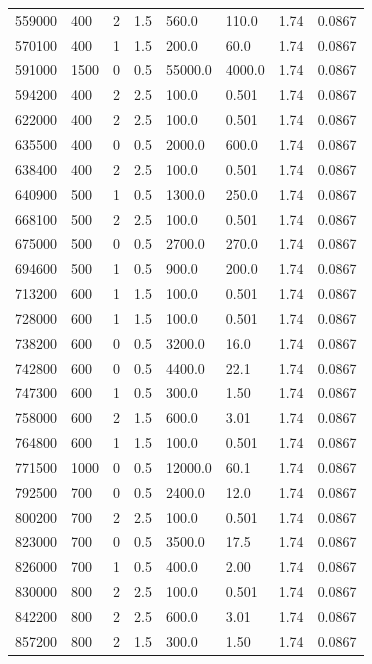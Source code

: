 \documentclass[preview]{standalone}
\begin{document}
{{{\begin{tabular}{L{1.2cm}C{1.2cm} C{0.3cm}C{0.5cm} C{1.4cm}C{1.4cm} C{1.4cm}C{1.4cm}}
  559000  &   400  & 2     & 1.5 &  560.0  & 110.0  & 1.74 &  0.0867   \\ 
  570100  &   400  & 1     & 1.5 &  200.0  & 60.0  & 1.74 &  0.0867   \\ 
  591000  &  1500  & 0     & 0.5 &  55000.0  & 4000.0  & 1.74 &  0.0867   \\ 
  594200  &   400  & 2     & 2.5 &  100.0  & 0.501  & 1.74 &  0.0867   \\ 
  622000  &   400  & 2     & 2.5 &  100.0  & 0.501  & 1.74 &  0.0867   \\ 
  635500  &   400  & 0     & 0.5 &  2000.0  & 600.0  & 1.74 &  0.0867   \\ 
  638400  &   400  & 2     & 2.5 &  100.0  & 0.501  & 1.74 &  0.0867   \\ 
  640900  &   500  & 1     & 0.5 &  1300.0  & 250.0  & 1.74 &  0.0867   \\ 
  668100  &   500  & 2     & 2.5 &  100.0  & 0.501  & 1.74 &  0.0867   \\ 
  675000  &   500  & 0     & 0.5 &  2700.0  & 270.0  & 1.74 &  0.0867   \\ 
  694600  &   500  & 1     & 0.5 &  900.0  & 200.0  & 1.74 &  0.0867   \\ 
  713200  &   600  & 1     & 1.5 &  100.0  & 0.501  & 1.74 &  0.0867   \\ 
  728000  &   600  & 1     & 1.5 &  100.0  & 0.501  & 1.74 &  0.0867   \\ 
  738200  &   600  & 0     & 0.5 &  3200.0  & 16.0  & 1.74 &  0.0867   \\ 
  742800  &   600  & 0     & 0.5 &  4400.0  & 22.1  & 1.74 &  0.0867   \\ 
  747300  &   600  & 1     & 0.5 &  300.0  & 1.50  & 1.74 &  0.0867   \\ 
  758000  &   600  & 2     & 1.5 &  600.0  & 3.01  & 1.74 &  0.0867   \\ 
  764800  &   600  & 1     & 1.5 &  100.0  & 0.501  & 1.74 &  0.0867   \\ 
  771500  &  1000  & 0     & 0.5 &  12000.0  & 60.1  & 1.74 &  0.0867   \\ 
  792500  &   700  & 0     & 0.5 &  2400.0  & 12.0  & 1.74 &  0.0867   \\ 
  800200  &   700  & 2     & 2.5 &  100.0  & 0.501  & 1.74 &  0.0867   \\ 
  823000  &   700  & 0     & 0.5 &  3500.0  & 17.5  & 1.74 &  0.0867   \\ 
  826000  &   700  & 1     & 0.5 &  400.0  & 2.00  & 1.74 &  0.0867   \\ 
  830000  &   800  & 2     & 2.5 &  100.0  & 0.501  & 1.74 &  0.0867   \\ 
  842200  &   800  & 2     & 2.5 &  600.0  & 3.01  & 1.74 &  0.0867   \\ 
  857200  &   800  & 2     & 1.5 &  300.0  & 1.50  & 1.74 &  0.0867   \\ 
\hline 
\end{tabular} 

}}}
\end{document}
